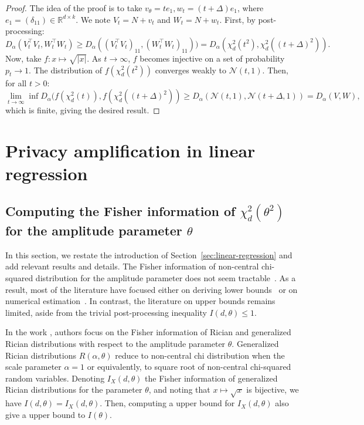 \documentclass{article}
\theoremstyle{plain}
\theoremstyle{definition}
\theoremstyle{remark}
\begin{document}
\propNoFreeLunch*

\begin{proof}
    The idea of the proof is to take $v_\theta = t e_1, w_t = (t + \Delta)e_1$, where $e_1 = (\delta_{11}) \in \mathbb{R}^{d\times k}$. We note $V_t = N + v_t$ and $W_t = N + w_t$.
    First, by post-processing:
    \[D_\alpha(V_t^\top V_t,W_t^\top W_t) \geq D_\alpha((V_t^\top V_t)_{11}, (W_t^\top W_t)_{11})) = D_\alpha(\chi_d^2(t^2),\chi_d^2((t+\Delta)^2)).\]
    Now, take $f : x \mapsto \sqrt{|x|}$. As $t \to \infty$, $f$ becomes injective on a set of probability $p_t \to 1$. The distribution of $f(\chi_d^2(t^2))$ converges weakly to $\mathcal{N}(t,1)$. Then, for all $t > 0$:
    \[\underset{t \to \infty}{\lim} \inf D_\alpha(f(\chi_d^2(t)),f(\chi_d^2((t + \Delta)^2)) \geq D_\alpha(\mathcal{N}(t,1), \mathcal{N}(t+\Delta, 1)) = D_\alpha(V,W),\]
    which is finite, giving the desired result.
\end{proof}

\section{Privacy amplification in linear regression}

\subsection{Computing the Fisher information of $\chi_d^2(\theta^2)$ for the amplitude parameter $\theta$}
\label{app:fisher-one-dim}

In this section, we restate the introduction of Section~\ref{sec:linear-regression} and add relevant results and details. The Fisher information of non-central chi-squared distribution for the amplitude parameter does not seem tractable~\citep{Idier2014}. As a result, most of the literature have focused either on deriving lower bounds~\citep{Bouhrara2018, Idier2014, Stein2016} or on numerical estimation~\citep{Bouhrara2018}. In contrast, the literature on upper bounds remains limited, aside from the trivial post-processing inequality $I(d,\theta) \leq 1$. 

In the work \citep{Idier2014}, authors focus on the Fisher information of Rician and generalized Rician distributions with respect to the amplitude parameter $\theta$. Generalized Rician distributions $R(\alpha, \theta)$ reduce to non-central chi distribution when the scale parameter $\alpha = 1$ or equivalently, to square root of non-central chi-squared random variables. Denoting $I_X(d,\theta)$ the Fisher information of generalized Rician distributions for the parameter $\theta$, and noting that $x \mapsto \sqrt{x}$ is bijective, we have $I(d,\theta) = I_X(d,\theta)$.
Then, computing a upper bound for $I_X(d,\theta)$ also give a upper bound to $I(\theta)$.
\end{document}
